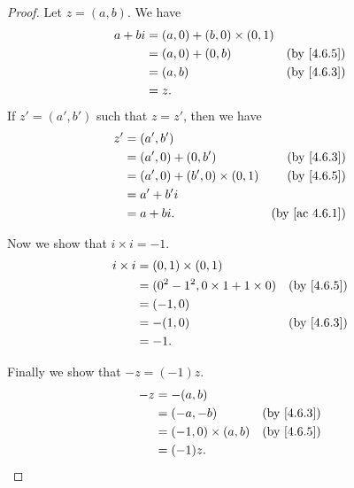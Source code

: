 \begin{proof}
  Let \(z = (a, b)\).
  We have
  \begin{align*}
    a + bi & = (a, 0) + (b, 0) \times (0, 1)                            \\
           & = (a, 0) + (0, b)               & \text{(by \cref{4.6.5})} \\
           & = (a, b)                        & \text{(by \cref{4.6.3})} \\
           & = z.
  \end{align*}
  If \(z' = (a', b')\) such that \(z = z'\), then we have
  \begin{align*}
    z' & = (a', b')                                                      \\
       & = (a', 0) + (0, b')               & \text{(by \cref{4.6.3})}    \\
       & = (a', 0) + (b', 0) \times (0, 1) & \text{(by \cref{4.6.5})}    \\
       & = a' + b' i                                                     \\
       & = a + bi.                         & \text{(by \cref{ac 4.6.1})}
  \end{align*}

  Now we show that \(i \times i = -1\).
  \begin{align*}
    i \times i & = (0, 1) \times (0, 1)                                            \\
               & = (0^2 - 1^2, 0 \times 1 + 1 \times 0) & \text{(by \cref{4.6.5})} \\
               & = (-1, 0)                                                         \\
               & = -(1, 0)                              & \text{(by \cref{4.6.3})} \\
               & = -1.
  \end{align*}

  Finally we show that \(-z = (-1) z\).
  \begin{align*}
    -z & = -(a, b)                                          \\
       & = (-a, -b)              & \text{(by \cref{4.6.3})} \\
       & = (-1, 0) \times (a, b) & \text{(by \cref{4.6.5})} \\
       & = (-1) z.
  \end{align*}
\end{proof}


